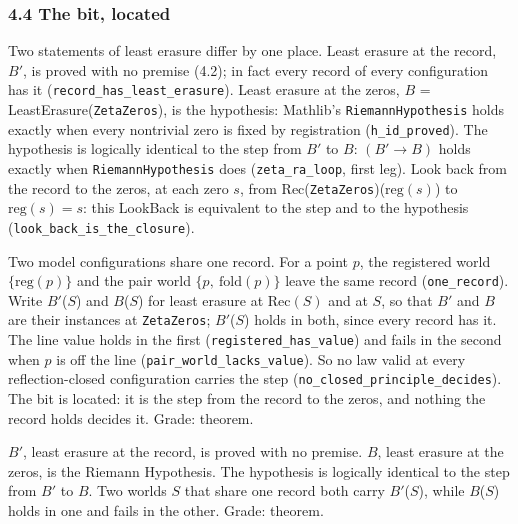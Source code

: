 \documentclass[10pt]{article}
\newenvironment{jbox}[2]{\par\vspace{7pt}\noindent{\color{accent}\rule{\linewidth}{0.8pt}}\par\nopagebreak[4]\vspace{1pt}%
  \noindent{\small\bfseries{\color{accent}Box #1}\enspace\textbar\enspace{\color{deep}#2}}\par\nopagebreak[4]\vspace{2pt}\small\setlength{\parindent}{0pt}\setlength{\parskip}{3pt}}%
  {\par\vspace{2pt}\noindent{\color{accent!45}\rule{\linewidth}{0.4pt}}\par\vspace{7pt}}
\begin{document}
\hypertarget{the-bit-located}{%
\subsubsection{4.4 The bit, located}\label{the-bit-located}}

Two statements of least erasure differ by one place. Least erasure at
the record, \(B'\), is proved with no premise (4.2); in fact every
record of every configuration has it
(\texttt{record\_\allowbreak{}has\_\allowbreak{}least\_\allowbreak{}erasure}).
Least erasure at the zeros, \(B\) = LeastErasure(\texttt{ZetaZeros}), is
the hypothesis: Mathlib's \texttt{RiemannHypothesis} holds exactly when
every nontrivial zero is fixed by registration
(\texttt{h\_\allowbreak{}id\_\allowbreak{}proved}). The hypothesis is
logically identical to the step from \(B'\) to \(B\): \((B' \to B)\)
holds exactly when \texttt{RiemannHypothesis} does
(\texttt{zeta\_\allowbreak{}ra\_\allowbreak{}loop}, first leg). Look
back from the record to the zeros, at each zero \(s\), from
Rec(\texttt{ZetaZeros})(\(\mathrm{reg}(s)\)) to \(\mathrm{reg}(s) = s\):
this LookBack is equivalent to the step and to the hypothesis
(\texttt{look\_\allowbreak{}back\_\allowbreak{}is\_\allowbreak{}the\_\allowbreak{}closure}).

Two model configurations share one record. For a point \(p\), the
registered world \(\{\mathrm{reg}(p)\}\) and the pair world
\(\{p,\ \mathrm{fold}(p)\}\) leave the same record
(\texttt{one\_\allowbreak{}record}). Write \(B'\)(\(S\)) and
\(B\)(\(S\)) for least erasure at \(\mathrm{Rec}(S)\) and at \(S\), so
that \(B'\) and \(B\) are their instances at \texttt{ZetaZeros};
\(B'\)(\(S\)) holds in both, since every record has it. The line value
holds in the first
(\texttt{registered\_\allowbreak{}has\_\allowbreak{}value}) and fails in
the second when \(p\) is off the line
(\texttt{pair\_\allowbreak{}world\_\allowbreak{}lacks\_\allowbreak{}value}).
So no law valid at every reflection-closed configuration carries the
step
(\texttt{no\_\allowbreak{}closed\_\allowbreak{}principle\_\allowbreak{}decides}).
The bit is located: it is the step from the record to the zeros, and
nothing the record holds decides it. Grade: theorem.

\begin{jbox}{3}{The bit}

\(B'\), least erasure at the record, is proved with no premise. \(B\),
least erasure at the zeros, is the Riemann Hypothesis. The hypothesis is
logically identical to the step from \(B'\) to \(B\). Two worlds \(S\)
that share one record both carry \(B'\)(\(S\)), while \(B\)(\(S\)) holds
in one and fails in the other. Grade: theorem.

\end{jbox}
\end{document}
